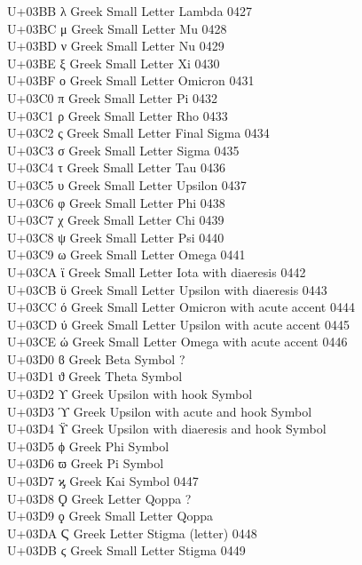 \documentclass[UTF8,nofonts]{ctexart}
\begin{document}
U+03BB  λ Greek Small Letter Lambda 0427\\
U+03BC  μ Greek Small Letter Mu 0428\\
U+03BD  ν Greek Small Letter Nu 0429\\
U+03BE  ξ Greek Small Letter Xi 0430\\
U+03BF  ο Greek Small Letter Omicron  0431\\
U+03C0  π Greek Small Letter Pi 0432\\
U+03C1  ρ Greek Small Letter Rho  0433\\
U+03C2  ς Greek Small Letter Final Sigma  0434\\
U+03C3  σ Greek Small Letter Sigma  0435\\
U+03C4  τ Greek Small Letter Tau  0436\\
U+03C5  υ Greek Small Letter Upsilon  0437\\
U+03C6  φ Greek Small Letter Phi  0438\\
U+03C7  χ Greek Small Letter Chi  0439\\
U+03C8  ψ Greek Small Letter Psi  0440\\
U+03C9  ω Greek Small Letter Omega  0441\\
U+03CA  ϊ Greek Small Letter Iota with diaeresis  0442\\
U+03CB  ϋ Greek Small Letter Upsilon with diaeresis 0443\\
U+03CC  ό Greek Small Letter Omicron with acute accent  0444\\
U+03CD  ύ Greek Small Letter Upsilon with acute accent  0445\\
U+03CE  ώ Greek Small Letter Omega with acute accent  0446\\
U+03D0  ϐ Greek Beta Symbol ?\\
U+03D1  ϑ Greek Theta Symbol\\
U+03D2  ϒ Greek Upsilon with hook Symbol\\
U+03D3  ϓ Greek Upsilon with acute and hook Symbol\\
U+03D4  ϔ Greek Upsilon with diaeresis and hook Symbol\\
U+03D5  ϕ Greek Phi Symbol\\
U+03D6  ϖ Greek Pi Symbol\\
U+03D7  ϗ Greek Kai Symbol  0447\\
U+03D8  Ϙ Greek Letter Qoppa  ?\\
U+03D9  ϙ Greek Small Letter Qoppa\\
U+03DA  Ϛ Greek Letter Stigma (letter)  0448\\
U+03DB  ϛ Greek Small Letter Stigma 0449\\
\end{document}
